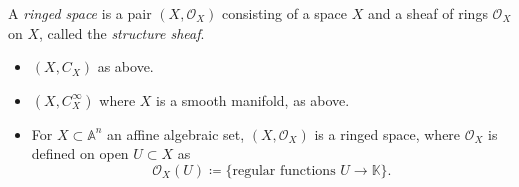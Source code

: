 \documentclass[12pt]{article}
\begin{document}
\begin{definition}
	A \emph{ringed space} is a pair $(X,\mathcal{O}_X)$ consisting of a space $X$ and a sheaf of rings $\mathcal{O}_X$ on $X$, called the \emph{structure sheaf}.
\end{definition}

\begin{example}
	\hfill 
	\begin{itemize}
		\item $(X, C_X)$ as above.
		\item $(X, C^\infty_X)$ where $X$ is a smooth manifold, as above.
		\item For $X\subset\mathbb{A}^n$ an affine algebraic set, $(X,\mathcal{O}_X)$ is a ringed space, where $\mathcal{O}_X$ is defined on open $U\subset X$ as 
			\begin{equation*}
				\mathcal{O}_X(U) \coloneqq \{\text{regular functions }U\to\mathbb{K} \}.
			\end{equation*}
	\end{itemize}
\end{example}
\end{document}
